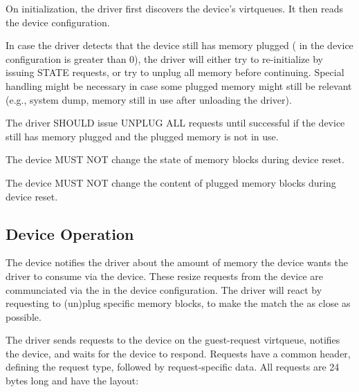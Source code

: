On initialization, the driver first discovers the device's virtqueues.  It
then reads the device configuration.

In case the driver detects that the device still has memory plugged
( in the device configuration is greater than 0), the
driver will either try to re-initialize by issuing STATE requests, or try
to unplug all memory before continuing.  Special handling might be
necessary in case some plugged memory might still be relevant (e.g., system
dump, memory still in use after unloading the driver).


The driver SHOULD issue UNPLUG ALL requests until successful if the device
still has memory plugged and the plugged memory is not in use.


The device MUST NOT change the state of memory blocks during device reset.

The device MUST NOT change the content of plugged memory blocks during
device reset.

\subsection{Device Operation}\label{sec:Device Types / Memory Device / Device Operation}

The device notifies the driver about the amount of memory the device wants
the driver to consume via the device.  These resize requests from the
device are communciated via the  in the device
configuration.  The driver will react by requesting to (un)plug specific
memory blocks, to make the  match the
 as close as possible.

The driver sends requests to the device on the guest-request virtqueue,
notifies the device, and waits for the device to respond.  Requests have a
common header, defining the request type, followed by request-specific
data.  All requests are 24 bytes long and have the layout:

